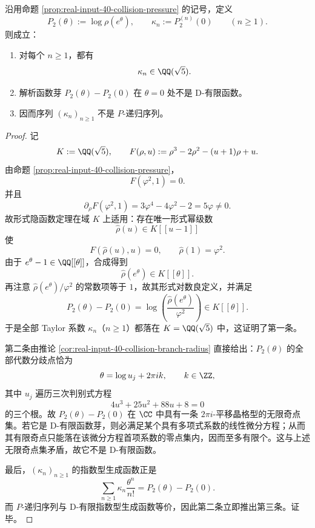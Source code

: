 \begin{theorem}\label{thm:derived-collision-cumulants-quadraticfield-nonholonomic}
沿用命题 \ref{prop:real-input-40-collision-pressure} 的记号，定义
\[
P_2(\theta):=\log \rho(e^\theta),
\qquad
\kappa_n:=P_2^{(n)}(0)\qquad(n\ge 1).
\]
则成立：
\begin{enumerate}
  \item 对每个 \(n\ge 1\)，都有
  \[
  \kappa_n\in\QQ(\sqrt5).
  \]
  \item 解析函数芽 \(P_2(\theta)-P_2(0)\) 在 \(\theta=0\) 处不是 D-有限函数。
  \item 因而序列 \((\kappa_n)_{n\ge 1}\) 不是 \(P\)-递归序列。
\end{enumerate}
\end{theorem}
\begin{proof}
记
\[
K:=\QQ(\sqrt5),
\qquad
F(\rho,u):=\rho^3-2\rho^2-(u+1)\rho+u.
\]
由命题 \ref{prop:real-input-40-collision-pressure}，
\[
F(\varphi^2,1)=0.
\]
并且
\[
\partial_\rho F(\varphi^2,1)
=3\varphi^4-4\varphi^2-2
=5\varphi\neq 0.
\]
故形式隐函数定理在域 \(K\) 上适用：存在唯一形式幂级数
\[
\widehat\rho(u)\in K[[u-1]]
\]
使
\[
F(\widehat\rho(u),u)=0,
\qquad
\widehat\rho(1)=\varphi^2.
\]
由于 \(e^\theta-1\in\QQ[[\theta]]\)，合成得到
\[
\widehat\rho(e^\theta)\in K[[\theta]].
\]
再注意 \(\widehat\rho(e^\theta)/\varphi^2\) 的常数项等于 \(1\)，故其形式对数良定义，并满足
\[
P_2(\theta)-P_2(0)
=
\log\!\left(\frac{\widehat\rho(e^\theta)}{\varphi^2}\right)\in K[[\theta]].
\]
于是全部 Taylor 系数 \(\kappa_n\)（\(n\ge 1\)）都落在 \(K=\QQ(\sqrt5)\) 中，这证明了第一条。

第二条由推论 \ref{cor:real-input-40-collision-branch-radius} 直接给出：\(P_2(\theta)\) 的全部代数分歧点恰为
\[
\theta=\log u_j+2\pi i k,
\qquad
k\in\ZZ,
\]
其中 \(u_j\) 遍历三次判别式方程
\[
4u^3+25u^2+88u+8=0
\]
的三个根。故 \(P_2(\theta)-P_2(0)\) 在 \(\CC\) 中具有一条 \(2\pi i\)-平移晶格型的无限奇点集。若它是 D-有限函数芽，则必满足某个具有多项式系数的线性微分方程；从而其有限奇点只能落在该微分方程首项系数的零点集内，因而至多有限个。这与上述无限奇点集矛盾，故它不是 D-有限函数。

最后，\((\kappa_n)_{n\ge 1}\) 的指数型生成函数正是
\[
\sum_{n\ge 1}\kappa_n\frac{\theta^n}{n!}
=
P_2(\theta)-P_2(0).
\]
而 \(P\)-递归序列与 D-有限指数型生成函数等价，因此第二条立即推出第三条。证毕。
\end{proof}

